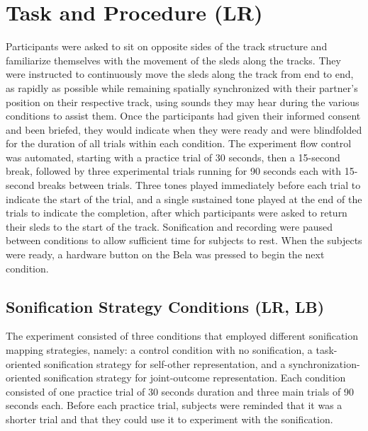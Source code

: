 \documentclass[10pt,a4paper,onecolumn]{article}
\begin{document}
\hypertarget{task-and-procedure-lr}{%
\section{Task and Procedure (LR)}\label{task-and-procedure-lr}}

Participants were asked to sit on opposite sides of the track structure and familiarize themselves with the movement of the sleds along the tracks. They were instructed to continuously move the sleds along the track from end to end, as rapidly as possible while remaining spatially synchronized with their partner's position on their respective track, using sounds they may hear during the various conditions to assist them. Once the participants had given their informed consent and been briefed, they would indicate when they were ready and were blindfolded for the duration of all trials within each condition. The experiment flow control was automated, starting with a practice trial of 30 seconds, then a 15-second break, followed by three experimental trials running for 90 seconds each with 15-second breaks between trials. Three tones played immediately before each trial to indicate the start of the trial, and a single sustained tone played at the end of the trials to indicate the completion, after which participants were asked to return their sleds to the start of the track. Sonification and recording were paused between conditions to allow sufficient time for subjects to rest. When the subjects were ready, a hardware button on the Bela was pressed to begin the next condition.

\hypertarget{sonification-strategy-conditions-lr-lb}{%
\subsection{Sonification Strategy Conditions (LR, LB)}\label{sonification-strategy-conditions-lr-lb}}

The experiment consisted of three conditions that employed different sonification mapping strategies, namely: a control condition with no sonification, a task-oriented sonification strategy for self-other representation, and a synchronization-oriented sonification strategy for joint-outcome representation. Each condition consisted of one practice trial of 30 seconds duration and three main trials of 90 seconds each. Before each practice trial, subjects were reminded that it was a shorter trial and that they could use it to experiment with the sonification.
\end{document}
